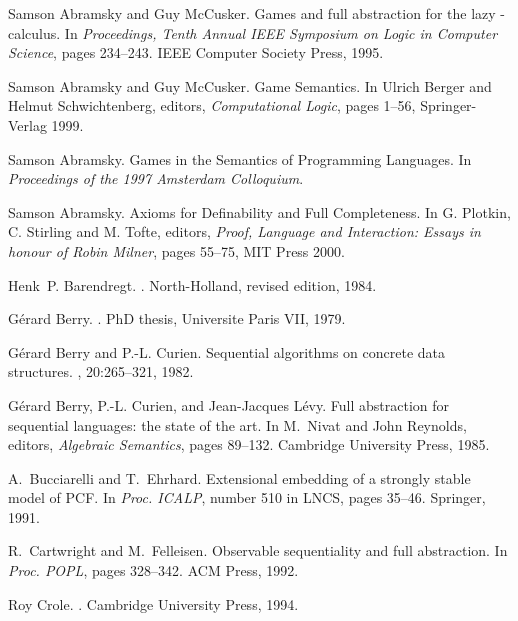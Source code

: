\documentclass[11pt]{article}
\begin{document}
\begin{thebibliography}{Cur92b}
Samson Abramsky and Guy McCusker.
\newblock Games and full abstraction for the lazy -calculus.
\newblock In {\em Proceedings, Tenth Annual IEEE Symposium on Logic in Computer
  Science}, pages 234--243. IEEE Computer Society Press, 1995.

Samson Abramsky and Guy McCusker.
\newblock Game Semantics.
\newblock In Ulrich Berger and Helmut Schwichtenberg, editors,
{\em Computational Logic}, pages 1--56, Springer-Verlag 1999.

Samson Abramsky.
\newblock Games in the Semantics of Programming Languages.
\newblock In {\em Proceedings of the 1997 Amsterdam Colloquium}.

Samson Abramsky.
\newblock Axioms for Definability and Full Completeness.
\newblock In G. Plotkin, C. Stirling and M. Tofte, editors,
{\em Proof, Language and Interaction: Essays in honour of
Robin Milner}, pages 55--75, MIT Press 2000.

Henk~P. Barendregt.
.
\newblock North-Holland, revised edition, 1984.

G{\'e}rard Berry.
.
\newblock PhD thesis, Universite Paris VII, 1979.

G{\'e}rard Berry and P.-L. Curien.
\newblock Sequential algorithms on concrete data structures.
, 20:265--321, 1982.

G{\'e}rard Berry, P.-L. Curien, and Jean-Jacques L\'evy.
\newblock Full abstraction for sequential languages: the state of the art.
\newblock In M.~Nivat and John Reynolds, editors, {\em Algebraic Semantics},
  pages 89--132. Cambridge University Press, 1985.

A.~Bucciarelli and T.~Ehrhard.
\newblock Extensional embedding of a strongly stable model of {PCF}.
\newblock In {\em Proc. ICALP}, number 510 in LNCS, pages 35--46. Springer,
  1991.

R.~Cartwright and M.~Felleisen.
\newblock Observable sequentiality and full abstraction.
\newblock In {\em Proc. POPL}, pages 328--342. ACM {P}ress, 1992.

Roy Crole.
.
\newblock Cambridge University Press, 1994.


\end{thebibliography}
\end{document}
